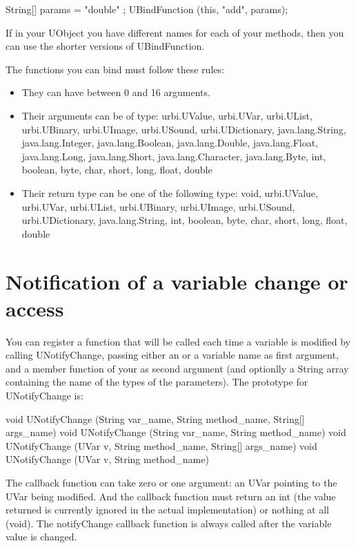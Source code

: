 \begin{cxx}
String[] params = { "double" };
UBindFunction (this, "add", params);
\end{cxx}

If in your UObject you have different names for each of your methods, then
you can use the shorter versions of UBindFunction.

The functions you can bind must follow these rules:
\begin{itemize}
\item They can have between 0 and 16 arguments.
\item Their arguments can be of type: urbi.UValue, urbi.UVar, urbi.UList,
  urbi.UBinary, urbi.UImage, urbi.USound, urbi.UDictionary,
  java.lang.String, java.lang.Integer, java.lang.Boolean, java.lang.Double,
  java.lang.Float, java.lang.Long, java.lang.Short, java.lang.Character,
  java.lang.Byte, int, boolean, byte, char, short, long, float, double
\item Their return type can be one of the following type:
 void, urbi.UValue, urbi.UVar, urbi.UList,
 urbi.UBinary, urbi.UImage, urbi.USound,
 urbi.UDictionary, java.lang.String, int, boolean,
 byte, char, short, long, float, double
\end{itemize}


\section{Notification of a variable change or access}
\label{sec:uob:apijava:uvar-notify}

You can register a function that will be called each time a
variable is modified by calling UNotifyChange, passing either an \UVar
or a variable name as first argument, and a member function of
your \UObject as second argument (and optionlly a String array containing
the name of the types of the parameters). The prototype for UNotifyChange is:

\begin{cxx}
void UNotifyChange (String var_name, String method_name, String[] args_name)
void UNotifyChange (String var_name, String method_name)
void UNotifyChange (UVar v, String method_name, String[] args_name)
void UNotifyChange (UVar v, String method_name)
\end{cxx}

The callback function can take zero or one argument: an UVar pointing to the
UVar being modified. And the callback function must return an int (the value
returned is currently ignored in the actual implementation) or nothing at all (void).
The notifyChange callback function is always called after the variable value
is changed.

